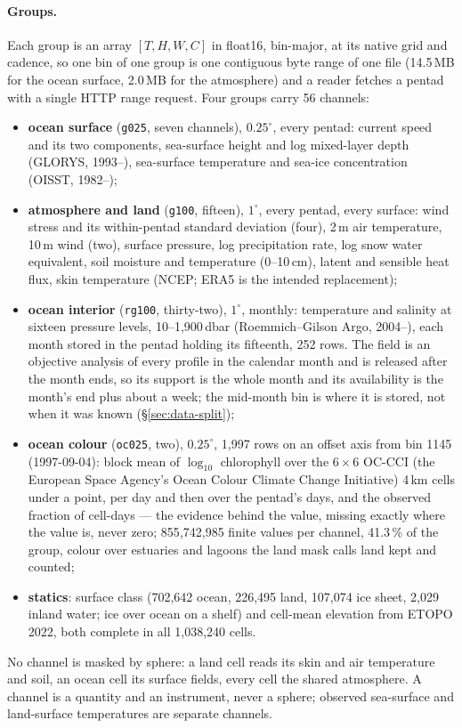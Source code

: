 \documentclass[10pt]{article}
\newcommand{\code}[1]{\texttt{#1}}
\begin{document}
\paragraph{Groups.} Each group is an array $[T,H,W,C]$ in float16, bin-major,
at its native grid and cadence, so one bin of one group is one contiguous
byte range of one file (14.5\,MB for the ocean surface, 2.0\,MB for the
atmosphere) and a reader fetches a pentad with a single HTTP range request.
Four groups carry 56 channels:
\begin{itemize}
\item \textbf{ocean surface} (\code{g025}, seven channels), $0.25^\circ$, every pentad: current speed and
its two components, sea-surface height and log mixed-layer depth (GLORYS,
1993--), sea-surface temperature and sea-ice concentration (OISST, 1982--);
\item \textbf{atmosphere and land} (\code{g100}, fifteen), $1^\circ$, every pentad, every surface:
wind stress and its within-pentad standard deviation (four), 2\,m air
temperature, 10\,m wind (two), surface pressure, log precipitation rate, log
snow water equivalent, soil moisture and temperature (0--10\,cm), latent and
sensible heat flux, skin temperature (NCEP; ERA5 is the intended
replacement);
\item \textbf{ocean interior} (\code{rg100}, thirty-two), $1^\circ$, monthly: temperature and salinity
at sixteen pressure levels, 10--1{,}900\,dbar (Roemmich--Gilson Argo,
2004--), each month stored in the pentad holding its fifteenth, 252 rows.
The field is an objective analysis of every profile in the calendar month
and is released after the month ends, so its support is the whole month and
its availability is the month's end plus about a week; the mid-month bin is
where it is stored, not when it was known (\S\ref{sec:data-split});
\item \textbf{ocean colour} (\code{oc025}, two), $0.25^\circ$, 1{,}997 rows on
an offset axis from bin 1145 (1997-09-04): block mean of
$\log_{10}$ chlorophyll over the $6\times6$ OC-CCI (the European Space
Agency's Ocean Colour Climate Change Initiative) 4\,km cells under a point,
per day and then over the pentad's days, and the observed fraction of
cell-days --- the evidence behind the value, missing exactly where the value
is, never zero; 855{,}742{,}985 finite values per channel, 41.3\,\% of the
group, colour over estuaries and lagoons the land mask calls land kept and
counted;
\item \textbf{statics}: surface class (702{,}642 ocean, 226{,}495 land,
107{,}074 ice sheet, 2{,}029 inland water; ice over ocean on a shelf) and
cell-mean elevation from ETOPO 2022, both complete in all 1{,}038{,}240 cells.
\end{itemize}
No channel is masked by sphere: a land cell reads its skin and air
temperature and soil, an ocean cell its surface fields, every cell the
shared atmosphere. A channel is a quantity and an instrument, never a
sphere; observed sea-surface and land-surface temperatures are separate
channels.
\end{document}
